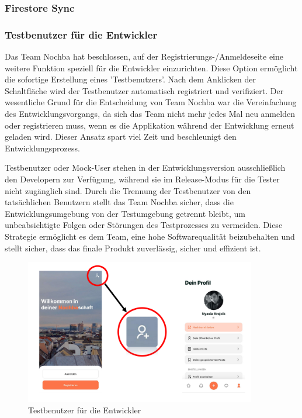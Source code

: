 \subsubsection{Firestore Sync}

\subsubsection{Testbenutzer für die Entwickler}

Das Team Nochba hat beschlossen, auf der Registrierungs-/Anmeldeseite eine weitere Funktion speziell für die Entwickler einzurichten. Diese Option ermöglicht die sofortige Erstellung eines 'Testbenutzers'. Nach dem Anklicken der Schaltfläche wird der Testbenutzer automatisch registriert und verifiziert. Der wesentliche Grund für die Entscheidung von Team Nochba war die Vereinfachung des Entwicklungsvorgangs, da sich das Team nicht mehr jedes Mal neu anmelden oder registrieren muss, wenn es die Applikation während der Entwicklung erneut geladen wird. Dieser Ansatz spart viel Zeit und beschleunigt den Entwicklungsprozess.

Testbenutzer oder Mock-User stehen in der Entwicklungsversion ausschließlich den Developern zur Verfügung, während sie im Release-Modus für die Tester nicht zugänglich sind. Durch die Trennung der Testbenutzer von den tatsächlichen Benutzern stellt das Team Nochba sicher, dass die Entwicklungsumgebung von der Testumgebung getrennt bleibt, um unbeabsichtigte Folgen oder Störungen des Testprozesses zu vermeiden. Diese Strategie ermöglicht es dem Team, eine hohe Softwarequalität beizubehalten und stellt sicher, dass das finale Produkt zuverlässig, sicher und effizient ist.

\begin{figure}[H]
  \centering
  \includegraphics[width=0.9\textwidth]{pics/dummy-user-screenshots.png}
  \caption{Testbenutzer für die Entwickler}
  \label{fig:dummy-user-screenshots}
\end{figure}


